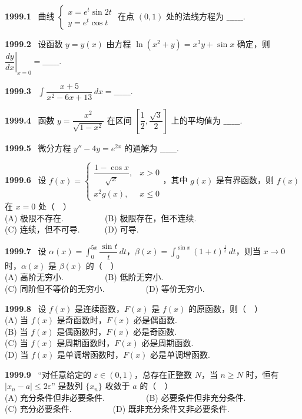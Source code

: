 \documentclass[UTF8,12pt]{ctexart}
\newcommand{\qn}[1]{\textbf{\large #1}\ }
\begin{document}
\qn{1999.1}
曲线 $\begin{cases} x = e^t \sin 2t \\ y = e^t \cos t \end{cases}$ 在点 $(0,1)$ 处的法线方程为 $\_\_\_\_\_\_$.

\vfill
\newpage
\qn{1999.2}
设函数 $y = y(x)$ 由方程 $\ln(x^2 + y) = x^3 y + \sin x$ 确定，则 $\left.\dfrac{dy}{dx}\right|_{x=0} = \_\_\_\_\_\_.$

\vfill
\newpage
\qn{1999.3}
$\int \dfrac{x + 5}{x^2 - 6x + 13} \, dx = \_\_\_\_\_\_.$

\vfill
\newpage
\qn{1999.4}
函数 $y = \dfrac{x^2}{\sqrt{1 - x^2}}$ 在区间 $\left[\dfrac{1}{2}, \dfrac{\sqrt{3}}{2}\right]$ 上的平均值为 $\_\_\_\_\_\_.$

\vfill
\newpage
\qn{1999.5}
微分方程 $y'' - 4y = e^{2x}$ 的通解为 $\_\_\_\_\_\_.$

\vfill
\newpage
\qn{1999.6}
设 $f(x) = \begin{cases} \dfrac{1 - \cos x}{\sqrt{x}}, & x > 0 \\ x^2 g(x), & x \leqslant 0 \end{cases}$，其中 $g(x)$ 是有界函数，则 $f(x)$ 在 $x = 0$ 处（　）
\\
\noindent (A) 极限不存在.　　　　　(B) 极限存在，但不连续.
\\
\noindent (C) 连续，但不可导.　　　(D) 可导.

\vfill
\newpage
\qn{1999.7}
设 $\alpha(x) = \int_0^{5x} \dfrac{\sin t}{t} \, dt$，$\beta(x) = \int_0^{\sin x} (1 + t)^{\frac{1}{t}} \, dt$，则当 $x \to 0$ 时，$\alpha(x)$ 是 $\beta(x)$ 的（　）
\\
\noindent (A) 高阶无穷小.　　　　　(B) 低阶无穷小.
\\
\noindent (C) 同阶但不等价的无穷小.　　　　　(D) 等价无穷小.

\vfill
\newpage
\qn{1999.8}
设 $f(x)$ 是连续函数，$F(x)$ 是 $f(x)$ 的原函数，则（　）
\\
\noindent (A) 当 $f(x)$ 是奇函数时，$F(x)$ 必是偶函数.
\\
\noindent (B) 当 $f(x)$ 是偶函数时，$F(x)$ 必是奇函数.
\\
\noindent (C) 当 $f(x)$ 是周期函数时，$F(x)$ 必是周期函数.
\\
\noindent (D) 当 $f(x)$ 是单调增函数时，$F(x)$ 必是单调增函数.

\vfill
\newpage
\qn{1999.9}
“对任意给定的 $\varepsilon \in (0,1)$，总存在正整数 $N$，当 $n \geqslant N$ 时，恒有 $|x_n - a| \leqslant 2\varepsilon$” 是数列 $\{x_n\}$ 收敛于 $a$ 的（　）
\\
\noindent (A) 充分条件但非必要条件.　　　　　(B) 必要条件但非充分条件.
\\
\noindent (C) 充分必要条件.　　　　　(D) 既非充分条件又非必要条件.
\end{document}
